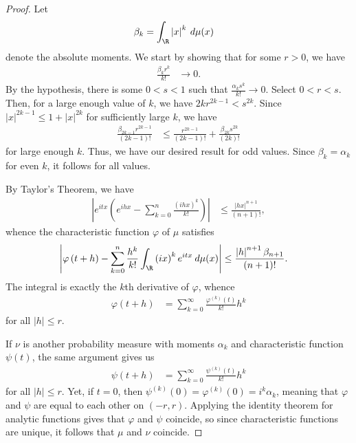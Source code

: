 \documentclass[10pt]{mypackage}
\begin{document}
\begin{proof}
  Let
  \begin{align*}
    \beta_k &= \int_{\R}^{} \left\vert x \right\vert^{k}\:d\mu(x)
  \end{align*}
  denote the absolute moments. We start by showing that for some $r > 0$, we have
  \begin{align*}
    \frac{\beta_k r^{k}}{k!} &\rightarrow 0.
  \end{align*}
  By the hypothesis, there is some $0 < s < 1$ such that $ \frac{\alpha_k s^{k}}{k!}\rightarrow 0 $. Select $0 < r < s$. Then, for a large enough value of $k$, we have $2kr^{2k-1} < s^{2k}$. Since $\left\vert x \right\vert^{2k-1} \leq 1 + \left\vert x \right\vert^{2k}$ for sufficiently large $k$, we have
  \begin{align*}
    \frac{\beta_{2k-1} r^{2k-1}}{\left( 2k-1 \right)!} &\leq \frac{r^{2k-1}}{\left( 2k-1 \right)!} + \frac{\beta_{2k}s^{2k}}{\left( 2k \right)!}
  \end{align*}
  for large enough $k$. Thus, we have our desired result for odd values. Since $\beta_k = \alpha_k$ for even $k$, it follows for all values.

  By Taylor's Theorem, we have
  \begin{align*}
    \left\vert e^{itx} \left( e^{ihx} - \sum_{k=0}^{n} \frac{\left( ihx \right)^{k}}{k!} \right)  \right\vert &\leq \frac{\left\vert hx \right\vert^{n+1}}{\left( n+1 \right)!},
  \end{align*}
  whence the characteristic function $\varphi$ of $\mu$ satisfies
  \begin{align*}
    \left\vert \varphi\left( t + h \right) - \sum_{k=0}^{n} \frac{h^{k}}{k!} \int_{\R}^{} \left( ix \right)^{k}e^{itx}\:d\mu(x) \right\vert &\leq \frac{\left\vert h \right\vert^{n+1}\beta_{n+1}}{\left( n+1 \right)!}.
  \end{align*}
  The integral is exactly the $k$th derivative of $\varphi$, whence
  \begin{align*}
    \varphi\left( t+h \right) &= \sum_{k=0}^{\infty} \frac{\varphi^{(k)}(t)}{k!}h^{k}
  \end{align*}
  for all $\left\vert h \right\vert\leq r$.

  If $\nu$ is another probability measure with moments $\alpha_k$ and characteristic function $\psi(t)$, the same argument gives us
  \begin{align*}
    \psi\left( t + h \right) &= \sum_{k=0}^{\infty} \frac{\psi^{(k)}(t)}{k!}h^{k}
  \end{align*}
  for all $\left\vert h \right\vert\leq r$. Yet, if $t = 0$, then $\psi^{(k)}(0) = \varphi^{(k)}(0) = i^{k}\alpha_k$, meaning that $\varphi$ and $\psi$ are equal to each other on $\left( -r,r \right)$. Applying the identity theorem for analytic functions gives that $\varphi$ and $\psi$ coincide, so since characteristic functions are unique, it follows that $\mu$ and $\nu$ coincide.
\end{proof}
\end{document}
